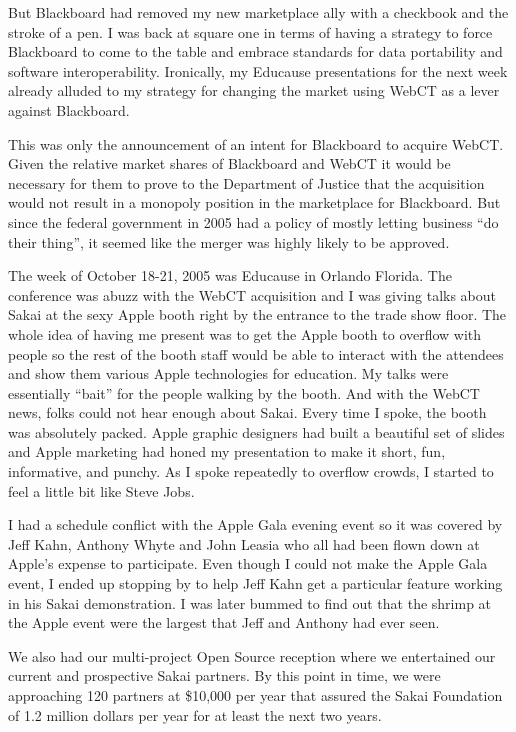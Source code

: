 \documentclass[12pt]{book}
\begin{document}
But Blackboard had removed my new marketplace ally
with a checkbook and the stroke of
a pen. I was back at square one in terms of having
a strategy to force Blackboard to come to the table
and embrace standards for data portability and software
interoperability.
Ironically, my Educause presentations for the next week
already alluded to my strategy for changing the market
using WebCT as a lever against Blackboard.

This was only the announcement of an intent for Blackboard
to acquire WebCT.  Given the relative market shares of
Blackboard and WebCT it would be necessary for them to
prove to the Department of Justice that the
acquisition would not result in a monopoly
position in the marketplace for Blackboard.  But since
the federal government in 2005 had a policy of mostly
letting business ``do their thing'', it seemed like the
merger was highly likely to be approved.

The week of October 18-21, 2005 was Educause in Orlando
Florida.  The conference was abuzz with the WebCT
acquisition and I was giving talks about Sakai
at the sexy Apple booth right by the entrance
to the trade show floor.  The whole idea of having me
present was to get the Apple booth to overflow with people
so the rest of the booth staff would be able to interact
with the attendees and show them various Apple technologies
for education.  My talks were essentially ``bait''
for the people walking by the booth.   And with the WebCT
news, folks could not hear enough about Sakai.  Every
time I spoke, the booth was absolutely packed.  Apple
graphic designers had built a beautiful set of slides
and Apple marketing had honed my presentation to make
it short, fun, informative, and punchy.  As I spoke
repeatedly to overflow crowds, I started to feel
a little bit like Steve Jobs.

I had a schedule conflict with the Apple Gala evening event
so it was covered by Jeff Kahn, Anthony Whyte and
John Leasia who all had been flown down at Apple's
expense to participate.  Even though I could not make the
Apple Gala event, I ended up stopping by to help Jeff Kahn
get a particular feature working in his Sakai
demonstration.  I was later bummed to find out that the
shrimp at the Apple event were the largest that Jeff and
Anthony had ever seen.

We also had our multi-project Open Source reception where
we entertained our current and prospective Sakai partners.
By this point in time, we were approaching 120 partners
at \$10,000 per year that assured the
Sakai Foundation of 1.2 million dollars per year for at
least the next two years.
\end{document}
